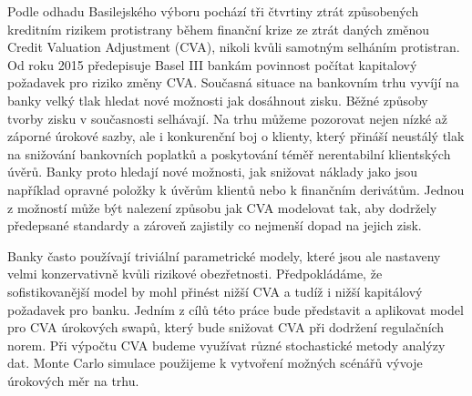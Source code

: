 \documentclass[a4paper,12pt]{report}
\theoremstyle{definition} \newtheorem{definice}[veta]{Definice}
\theoremstyle{remark}
\begin{document}
Podle odhadu Basilejského výboru pochází tři čtvrtiny ztrát způsobených kreditním rizikem protistrany během finanční krize ze ztrát daných změnou Credit Valuation Adjustment (CVA), nikoli kvůli samotným selháním protistran. 
Od roku 2015 předepisuje Basel III bankám povinnost počítat kapitalový požadavek pro riziko změny CVA.
Současná situace na bankovním trhu vyvíjí na banky velký tlak hledat nové možnosti jak dosáhnout zisku.
Běžné způsoby tvorby zisku v současnosti selhávají.
Na trhu můžeme pozorovat nejen nízké až záporné úrokové sazby, ale i konkurenční boj o klienty, který přináší neustálý tlak na snižování bankovních poplatků a poskytování téměř nerentabilní klientských úvěrů.
Banky proto hledají nové možnosti, jak snižovat náklady jako jsou například opravné položky k úvěrům klientů nebo k finančním derivátům.
Jednou z možností může být nalezení způsobu jak CVA modelovat tak, aby dodržely předepsané standardy a zároveň zajistily co nejmenší dopad na jejich zisk. 

Banky často používají triviální parametrické modely, které jsou ale nastaveny velmi konzervativně kvůli rizikové obezřetnosti.
Předpokládáme, že sofistikovanější model by mohl přinést nižší CVA a tudíž i nižší kapitálový požadavek pro banku. 
Jedním z cílů této práce bude představit a aplikovat model pro CVA úrokových swapů, který bude snižovat CVA při dodržení regulačních norem.
Při výpočtu CVA budeme využívat různé stochastické metody analýzy dat.
Monte Carlo simulace použijeme k vytvoření  možných scénářů vývoje úrokových měr na trhu. 

\end{document}

